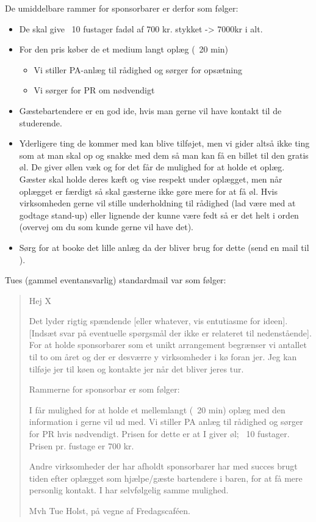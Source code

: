 De umiddelbare rammer for sponsorbarer er derfor som følger:
\begin{itemize}
\item De skal give ~10 fustager fadøl af 700 kr. stykket -> 7000kr i
  alt.
\item For den pris køber de et medium langt oplæg (~20 min)
  \begin{itemize}
  \item Vi stiller PA-anlæg til rådighed og sørger for opsætning
  \item Vi sørger for PR om nødvendigt
  \end{itemize}
\item Gæstebartendere er en god ide, hvis man gerne vil have kontakt
  til de studerende.
\item Yderligere ting de kommer med kan blive tilføjet, men vi gider
  altså ikke ting som at man skal op og snakke med dem så man kan få
  en billet til den gratis øl. De giver øllen væk og for det får de
  mulighed for at holde et oplæg. Gæster skal holde deres kæft og vise
  respekt under oplægget, men når oplægget er færdigt så skal gæsterne
  ikke gøre mere for at få øl. Hvis virksomheden gerne vil stille
  underholdning til rådighed (lad være med at godtage stand-up) eller
  lignende der kunne være fedt så er det helt i orden (overvej om du
  som kunde gerne vil have det).
\item Sørg for at booke det lille anlæg da der bliver brug for dette
  (send en mail til \bestmail).
\end{itemize}


Tues (gammel eventansvarlig) standardmail var som følger:
\begin{quote}
  Hej X

  Det lyder rigtig spændende [eller whatever, vis entutiasme for
  ideen]. [Indsæt svar på eventuelle spørgsmål der ikke er relateret
  til nedenstående]. For at holde sponsorbarer som et unikt
  arrangement begrænser vi antallet til to om året og der er desværre
  y virksomheder i kø foran jer. Jeg kan tilføje jer til køen og
  kontakte jer når det bliver jeres tur.

  Rammerne for sponsorbar er som følger:

  I får mulighed for at holde et mellemlangt (~20 min) oplæg med den
  information i gerne vil ud med. Vi stiller PA anlæg til rådighed og
  sørger for PR hvis nødvendigt. Prisen for dette er at I giver øl;
  ~10 fustager. Prisen pr. fustage er 700 kr.

  Andre virksomheder der har afholdt sponsorbarer har med succes brugt
  tiden efter oplægget som hjælpe/gæste bartendere i baren, for at få
  mere personlig kontakt. I har selvfølgelig samme mulighed.

  Mvh Tue Holst, på vegne af Fredagscaféen.
\end{quote}

